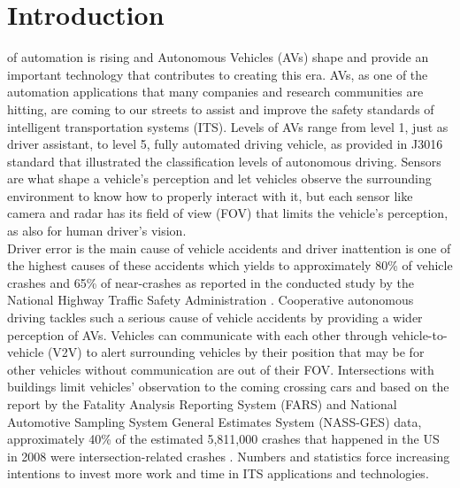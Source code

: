 \section{Introduction}
 of automation is rising and Autonomous Vehicles (AVs) shape and provide an important technology that contributes to creating this era. AVs, as one of the automation applications that many companies and research communities are hitting, are coming to our streets to assist and improve the safety standards of intelligent transportation systems (ITS). Levels of AVs range from level 1, just as driver assistant, to level 5, fully automated driving vehicle, as provided in J3016 standard \cite{TaxonomyAD} that illustrated the classification levels of autonomous driving. Sensors are what shape a vehicle's perception and let vehicles observe the surrounding environment to know how to properly interact with it, but each sensor like camera and radar has its field of view (FOV) that limits the vehicle's perception, as also for human driver's vision. \\
Driver error is the main cause of vehicle accidents and driver inattention is one of the highest causes of these accidents which yields to approximately 80\% of vehicle crashes and 65\% of near-crashes as reported in the conducted study by the National Highway Traffic Safety Administration \cite{dingus2006100}.
Cooperative autonomous driving tackles such a serious cause of vehicle accidents by providing a wider perception of AVs. Vehicles can communicate with each other through vehicle-to-vehicle (V2V) to alert surrounding vehicles by their position that may be for other vehicles without communication are out of their FOV. Intersections with buildings limit vehicles' observation to the coming crossing cars and based on the report by the Fatality Analysis Reporting System (FARS) and National Automotive Sampling System General Estimates System (NASS-GES) data, approximately 40\% of the estimated 5,811,000 crashes that happened in the US in 2008 were intersection-related crashes \cite{choi2010crash}. Numbers and statistics force increasing intentions to invest more work and time in ITS applications and technologies. \\
